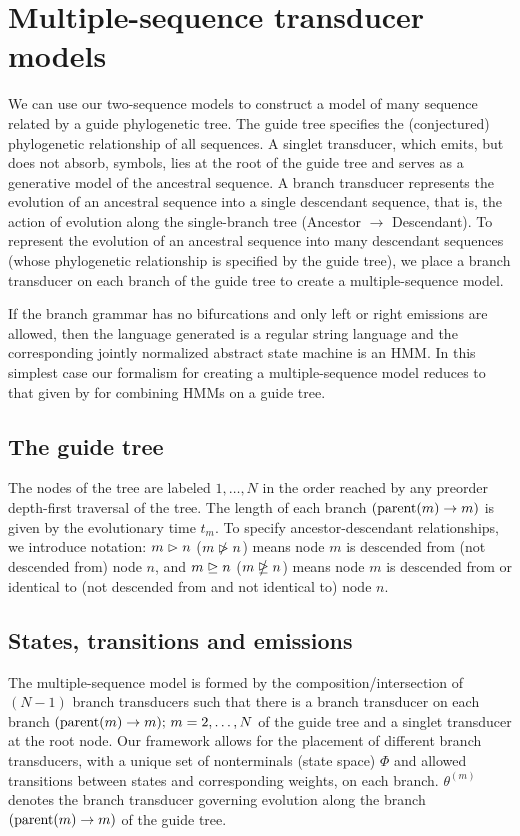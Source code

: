 \documentclass[10pt]{article}
\begin{document}
\newpage
\section{Multiple-sequence transducer models} 

We can use our two-sequence models to construct a model of many sequence related by a
guide phylogenetic tree.
The guide tree specifies the (conjectured) phylogenetic relationship of all sequences.
A singlet transducer, which emits, but does not absorb, symbols, lies at the root of the guide tree and 
serves as a generative model of the ancestral sequence.
A branch transducer represents the evolution of an ancestral sequence into a single descendant 
sequence, that is, the action of evolution along the single-branch tree (Ancestor $\to$ Descendant).
To represent the evolution of an ancestral sequence into many descendant sequences
(whose phylogenetic relationship is specified by the guide tree),
we place a branch transducer on each branch of the guide tree to create a multiple-sequence model.

If the branch grammar has no bifurcations and only left or right emissions are allowed, then
the language generated is a regular string language and the corresponding jointly normalized abstract state machine is 
an HMM.  In this simplest case our formalism for creating a multiple-sequence model reduces to that given 
by \cite{Holmes2003} for combining HMMs on a guide tree.


\subsection{The guide tree}
The nodes of the tree are labeled $1,\dots,N$ in the order reached by any preorder depth-first traversal of the tree.
The length of each branch $(\operatorname{parent}(m) \to m)$ is given by the evolutionary time $t_m$.
To specify ancestor-descendant relationships, we introduce notation:
$m \vartriangleright n$ ($m \ntriangleright n$) means node $m$ is descended from (not descended from) node $n$, and
$m \trianglerighteq n$ ($m \ntrianglerighteq n$) means node $m$ is descended from or identical to (not descended from and not identical to) node $n$.

\subsection{States, transitions and emissions}
The multiple-sequence model is formed by the composition/intersection of $(N-1)$ branch transducers 
such that there is a branch transducer on each branch $(\operatorname{parent}(m) \to m);\, m = 2,\dots,N$ of the guide tree and a singlet transducer at the root node.
Our framework allows for the placement of different branch transducers, with a unique set of nonterminals (state space) $\Phi$ and
allowed transitions between states and corresponding weights, on each branch.  $\theta^{(m)}$ denotes 
the branch transducer governing evolution along the branch $(\operatorname{parent}(m) \to m)$ of the guide tree.
\end{document}
